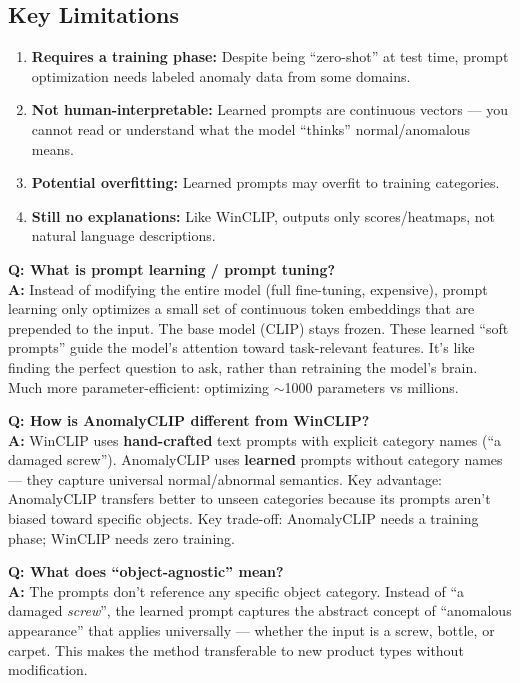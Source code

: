 \documentclass[12pt, a4paper]{article}
\begin{document}
\subsection{Key Limitations}
\begin{enumerate}[leftmargin=*]
    \item \textbf{Requires a training phase:} Despite being ``zero-shot'' at test time, prompt optimization needs labeled anomaly data from some domains.
    \item \textbf{Not human-interpretable:} Learned prompts are continuous vectors --- you cannot read or understand what the model ``thinks'' normal/anomalous means.
    \item \textbf{Potential overfitting:} Learned prompts may overfit to training categories.
    \item \textbf{Still no explanations:} Like WinCLIP, outputs only scores/heatmaps, not natural language descriptions.
\end{enumerate}

\begin{vivaqa}
\textbf{Q: What is prompt learning / prompt tuning?}\\[4pt]
\textbf{A:} Instead of modifying the entire model (full fine-tuning, expensive), prompt learning only optimizes a small set of continuous token embeddings that are prepended to the input. The base model (CLIP) stays frozen. These learned ``soft prompts'' guide the model's attention toward task-relevant features. It's like finding the perfect question to ask, rather than retraining the model's brain. Much more parameter-efficient: optimizing $\sim$1000 parameters vs millions.
\end{vivaqa}

\begin{vivaqa}
\textbf{Q: How is AnomalyCLIP different from WinCLIP?}\\[4pt]
\textbf{A:} WinCLIP uses \textbf{hand-crafted} text prompts with explicit category names (``a damaged screw''). AnomalyCLIP uses \textbf{learned} prompts without category names --- they capture universal normal/abnormal semantics. Key advantage: AnomalyCLIP transfers better to unseen categories because its prompts aren't biased toward specific objects. Key trade-off: AnomalyCLIP needs a training phase; WinCLIP needs zero training.
\end{vivaqa}

\begin{vivaqa}
\textbf{Q: What does ``object-agnostic'' mean?}\\[4pt]
\textbf{A:} The prompts don't reference any specific object category. Instead of ``a damaged \textit{screw}'', the learned prompt captures the abstract concept of ``anomalous appearance'' that applies universally --- whether the input is a screw, bottle, or carpet. This makes the method transferable to new product types without modification.
\end{vivaqa}
\end{document}
